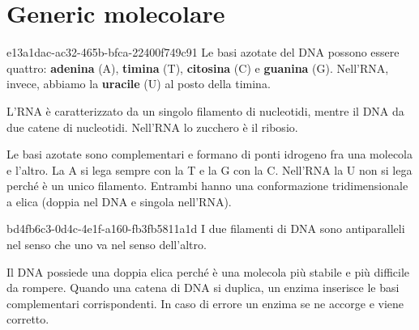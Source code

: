 \documentclass[preview]{standalone}
\begin{document}
\genpage


\section{Generic molecolare}

\begin{snippet}{e13a1dac-ac32-465b-bfca-22400f749c91}
    Le basi azotate del DNA possono essere quattro:
    \textbf{adenina} (A),
    \textbf{timina} (T),
    \textbf{citosina} (C) e
    \textbf{guanina} (G).
    Nell'RNA, invece, abbiamo la \textbf{uracile} (U) al posto della timina.

    L'RNA è caratterizzato da un singolo filamento di nucleotidi,
    mentre il DNA da due catene di nucleotidi.
    Nell'RNA lo zucchero è il ribosio.


    Le basi azotate sono complementari e formano di ponti idrogeno
    fra una molecola e l'altro.
    La A si lega sempre con la T e la G con la C.
    Nell'RNA la U non si lega perché è un unico filamento.
    Entrambi hanno una conformazione tridimensionale a elica
    (doppia nel DNA e singola nell'RNA).
\end{snippet}


\begin{snippet}{bd4fb6c3-0d4c-4e1f-a160-fb3fb5811a1d}
    I due filamenti di DNA sono antiparalleli nel senso
    che uno va nel senso dell'altro.

    Il DNA possiede una doppia elica perché è una molecola
    più stabile e più difficile da rompere.
    Quando una catena di DNA si duplica, un enzima
    inserisce le basi complementari corrispondenti.
    In caso di errore un enzima se ne accorge e viene corretto.
\end{snippet}
\end{document}
